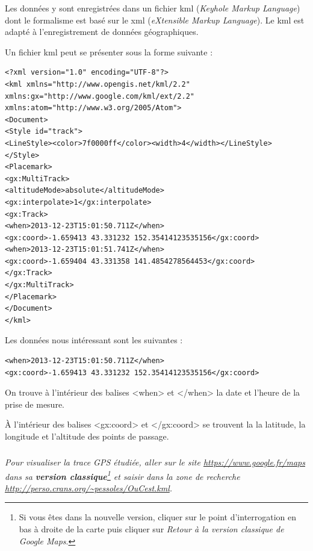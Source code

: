 \documentclass[10pt,oneside]{article}
\begin{document}
Les données y sont enregistrées dans un fichier \textsf{kml} (\textit{Keyhole Markup Language}) dont le formalisme est basé sur le \textsf{xml} (\textit{eXtensible Markup Language}). Le \textsf{kml}  est adapté à l'enregistrement de données géographiques. 

\begin{exemple}
Un fichier \textsf{kml} peut se présenter sous la forme suivante : 

\footnotesize
\begin{verbatim}
<?xml version="1.0" encoding="UTF-8"?>
<kml xmlns="http://www.opengis.net/kml/2.2"
xmlns:gx="http://www.google.com/kml/ext/2.2"
xmlns:atom="http://www.w3.org/2005/Atom">
<Document>
<Style id="track">
<LineStyle><color>7f0000ff</color><width>4</width></LineStyle>
</Style>
<Placemark>
<gx:MultiTrack>
<altitudeMode>absolute</altitudeMode>
<gx:interpolate>1</gx:interpolate>
<gx:Track>
<when>2013-12-23T15:01:50.711Z</when>
<gx:coord>-1.659413 43.331232 152.35414123535156</gx:coord>
<when>2013-12-23T15:01:51.741Z</when>
<gx:coord>-1.659404 43.331358 141.4854278564453</gx:coord>
</gx:Track>
</gx:MultiTrack>
</Placemark>
</Document>
</kml>
\end{verbatim}

\normalsize

Les données nous intéressant sont les suivantes :
\begin{verbatim}
<when>2013-12-23T15:01:50.711Z</when>
<gx:coord>-1.659413 43.331232 152.35414123535156</gx:coord>
\end{verbatim}

On trouve à l'intérieur des balises \textsf{<when>} et \textsf{</when>} la date et l'heure de la prise de mesure.

\`A l'intérieur des balises \textsf{<gx:coord>} et \textsf{</gx:coord>} se trouvent la la latitude, la longitude et l'altitude des points de passage. 


\end{exemple}



\subparagraph{}
\textit{Pour visualiser la trace GPS étudiée, aller sur le site  \url{https://www.google.fr/maps} dans sa \textbf{version classique}\footnote{Si vous êtes dans la nouvelle version, cliquer sur le point d'interrogation en bas à droite de la carte puis cliquer sur \textit{Retour à la version classique de Google Maps}.} et saisir dans la zone de recherche \url{http://perso.crans.org/~pessoles/OuCest.kml}.}
\end{document}
